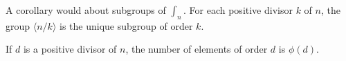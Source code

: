     A corollary would about subgroups of \(\int_n\). For each positive divisor \(k\) of \(n\), the group \(\langle n/k \rangle\) is the unique subgroup of order \(k\).

    \begin{thm}
        If \(d\) is a positive divisor of \(n\), the number of elements of order \(d\) is \(\phi(d)\).
    \end{thm}

